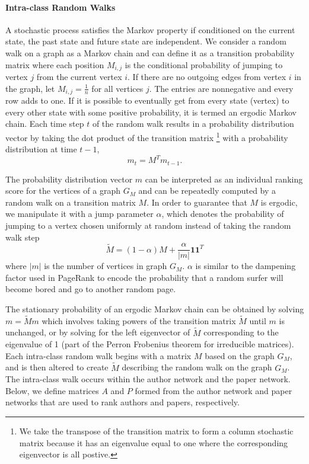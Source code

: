 \paragraph{Intra-class Random Walks}
A stochastic process satisfies the Markov property if conditioned on the current state, the past state and future state are independent. We consider a random walk on a graph as a Markov chain and can define it as a transition probability matrix where each position $M_{i,j}$ is the conditional probability of jumping to vertex $j$ from the current vertex $i$. If there are no outgoing edges from vertex $i$ in the graph, let $M_{i,j} = \frac{1}{n}$ for all vertices $j$. The entries are nonnegative and every row adds to one. If it is possible to eventually get from every state (vertex) to every other state with some positive probability, it is termed an ergodic Markov chain. Each time step $t$ of the random walk results in a probability distribution vector by taking the dot product of the transition matrix \footnote{We take the transpose of the transition matrix to form a column stochastic matrix because it has an eigenvalue equal to one where the corresponding eigenvector is all postive.} with a probability distribution at time $t-1$, 
    \begin{equation}
        m_t = M^Tm_{t-1}.
    \end{equation}

The probability distribution vector $m$ can be interpreted as an individual ranking score for the vertices of a graph $G_M$ and can be repeatedly computed by a random walk on a transition matrix $M$. In order to guarantee that $M$ is ergodic, we manipulate it with a jump parameter $\alpha$, which denotes the probability of jumping to a vertex chosen uniformly at random instead of taking the random walk step
    \begin{equation}
        \tilde{M} = (1-\alpha)M + \frac{\alpha}{|m|} \textbf{1}\textbf{1}^T  
    \end{equation}
where $|m|$ is the number of vertices in graph $G_M$. $\alpha$ is similar to the dampening factor used in PageRank to encode the probability that a random surfer will become bored and go to another random page.

The stationary probability of an ergodic Markov chain can be obtained by solving $m = \tilde{M}m$ which involves taking powers of the transition matrix $\tilde{M}$ until $m$ is unchanged, or by solving for the left eigenvector of $\tilde{M}$ corresponding to the eigenvalue of 1 (part of the Perron Frobenius theorem for irreducible matrices). Each intra-class random walk begins with a matrix $M$ based on the graph $G_M$, and is then altered to create $\tilde{M}$ describing the random walk on the graph $G_M$. The intra-class walk occurs within the author network and the paper network. Below, we define matrices $A$ and $P$ formed from the author network and paper networks that are used to rank authors and papers, respectively.

